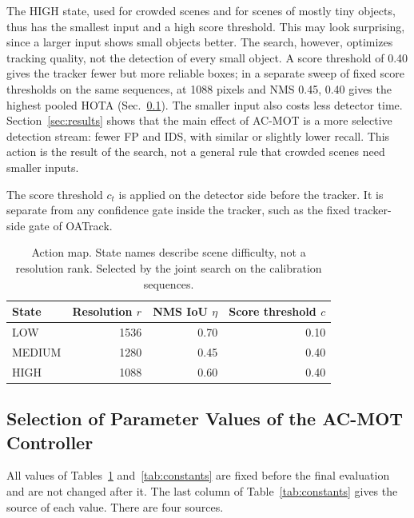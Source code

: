 \documentclass[journal]{new-aiaa}
\begin{document}
The HIGH state, used for crowded scenes and for scenes of mostly tiny objects,
thus has the smallest input and a high score threshold. This may look
surprising, since a larger input shows small objects better. The search,
however, optimizes tracking quality, not the detection of every small object.
A score threshold of 0.40 gives the tracker fewer but more reliable boxes; in
a separate sweep of fixed score thresholds on the same sequences, at 1088
pixels and NMS 0.45, 0.40 gives the highest pooled HOTA
(Sec.~\ref{sec:constants}). The smaller input also
costs less detector time. Section~\ref{sec:results} shows that the main effect
of AC-MOT is a more selective detection stream: fewer FP and
IDS, with similar or slightly lower recall. This action is the
result of the search, not a general rule that crowded scenes need smaller
inputs.

The score threshold $c_t$ is applied on the detector side before the tracker.
It is separate from any confidence gate inside the tracker, such as the fixed
tracker-side gate of OATrack.

\begin{table}[htbp]
\caption{Action map. State names describe scene difficulty, not a resolution
rank. Selected by the joint search on the calibration sequences.}
\label{tab:actions}
\centering\footnotesize
\begin{tabular}{@{}lrrr@{}}
\toprule
State & Resolution $r$ & NMS IoU $\eta$ & Score threshold $c$\\
\midrule
LOW & 1536 & 0.70 & 0.10\\
MEDIUM & 1280 & 0.45 & 0.40\\
HIGH & 1088 & 0.60 & 0.40\\
\bottomrule
\end{tabular}
\end{table}

\subsection{Selection of Parameter Values of the AC-MOT Controller}\label{sec:constants}
All values of Tables~\ref{tab:actions} and~\ref{tab:constants} are fixed
before the final evaluation and are not changed after it. The last column of
Table~\ref{tab:constants} gives the source of each value. There are four
sources.
\end{document}
